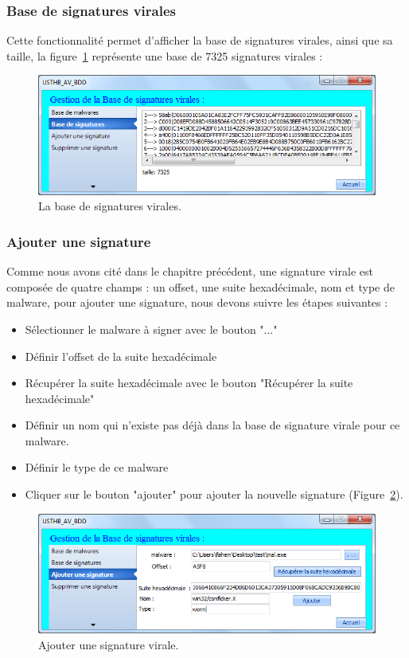 \subsubsection{Base de signatures virales}
Cette fonctionnalité permet d'afficher la base de signatures virales, ainsi que sa taille, la figure~\ref{fig :im14} représente une base de 7325 signatures virales :
\begin{figure}[H]
\begin{center}
\includegraphics[scale=0.7]{Figures/im14.png}
\caption{La base de signatures virales.}
\label{fig :im14} 
\end{center}
\end{figure}
\subsubsection{Ajouter une signature}
Comme nous avons cité dans le chapitre précédent, une signature virale est composée de quatre champs : un offset, une suite hexadécimale, nom et type de malware, pour ajouter une signature, nous devons suivre les étapes suivantes :
\begin{itemize}
\item Sélectionner le malware à signer avec le bouton "..."
\item Définir l'offset de la suite hexadécimale
\item Récupérer la suite hexadécimale avec le bouton "Récupérer la suite hexadécimale"
\item Définir un nom qui n'existe pas déjà dans la base de signature virale pour ce malware.
\item Définir le type de ce malware 
\item Cliquer sur le bouton "ajouter" pour ajouter la nouvelle signature (Figure~\ref{fig :im7}).      
\end{itemize}
\begin{figure}[H]
\begin{center}
\includegraphics[scale=0.7]{Figures/im7.png}
\caption{Ajouter une signature virale.}
\label{fig :im7} 
\end{center}
\end{figure}

